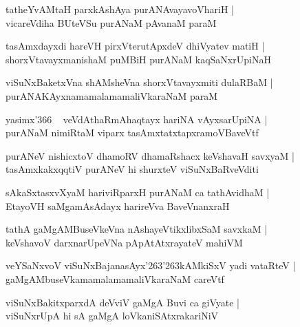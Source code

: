 \documentclass[twoside,12pt,openright]{book}
\def\S{\char'263}
\newcounter{shloka}[chapter]
\begin{document}
\begin{shloka}
tatheYvAMtaH parxkAshAya purANAvayavoVhariH |\\
vicareVdiha BUteVSu purANaM pAvanaM paraM 
\end{shloka}

\begin{shloka}
tasAmxdayxdi hareVH  pirxVterutApxdeV dhiVyatev matiH |\\
shorxVtavayxmanishaM puMBiH purANaM kaqSaNxrUpiNaH 
\end{shloka}

\begin{shloka}
viSuNxBaketxVna shAMsheVna shorxVtavayxmiti dulaRBaM |\\
purANAKAyxnamamalamamaliVkaraNaM  paraM 
\end{shloka}

\begin{shloka}
yasimx\char'366 ~ veVdAthaRmAhaqtayx hariNA vAyxsarUpiNA |\\
purANaM nimiRtaM viparx tasAmxtatxtapxramoVBaveVtf 
\end{shloka}

\begin{shloka}
purANeV nishicxtoV dhamoRV dhamaRshacx keVshavaH savxyaM |\\
tasAmxkakxqqtiV purANeV hi shurxteV viSuNxBaRveVditi
\end{shloka}

\begin{shloka}
sAkaSxtasxvXyaM hariviRparxH purANaM ca tathAvidhaM |\\
EtayoVH saMgamAsAdayx harireVva BaveVnanxraH 
\end{shloka}

\begin{shloka}
tathA gaMgAMBuseVkeVna nAshayeVtikxlibxSaM savxkaM |\\
keVshavoV darxnarUpeVNa pApAtAtxrayateV mahiVM 
\end{shloka}

\begin{shloka}
veYSaNxvoV viSuNxBajanasAyx\S\S kAMkiSxV yadi vataRteV |\\
gaMgAMbuseVkamamalamamaliVkaraNaM careVtf 
\end{shloka}

\begin{shloka}
viSuNxBakitxparxdA deVviV gaMgA Buvi ca giVyate |\\
viSuNxrUpA hi sA gaMgA loVkaniSAtxrakariNiV 
\end{shloka}
\end{document}
